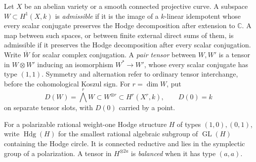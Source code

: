 \documentclass[11pt]{article}
\newcommand{\C}{\mathbb C}
\theoremstyle{plain}
\theoremstyle{definition}
\theoremstyle{remark}
\numberwithin{equation}{section}
\begin{document}
Let \(X\) be an abelian variety or a smooth connected projective curve.
A subspace \(W\subset H^1(X,k)\) is \emph{admissible} if it is the image
of a \(k\)-linear idempotent whose every scalar conjugate preserves the
Hodge decomposition after extension to \(\C\).  A map between such
spaces, or between finite external direct sums of them, is admissible
if it preserves the Hodge decomposition after every scalar conjugation.
Write \(\overline W\) for scalar complex conjugation.  A \emph{pair
tensor} between \(W,W'\) is a tensor in \(W\otimes W'\) inducing an
isomorphism \(W^*\to W'\), whose every scalar conjugate has type
\((1,1)\).  Symmetry and alternation refer to ordinary tensor
interchange, before the cohomological Koszul sign.  For \(r=\dim W\), put
\[
 D(W)=\bigwedge^rW\subset W^{\otimes r}\subset H^r(X^r,k),
 \qquad D(0)=k
\]
on separate tensor slots, with \(D(0)\) carried by a point.

For a polarizable rational weight-one Hodge structure \(H\) of types
\((1,0),(0,1)\), write \(\operatorname{Hdg}(H)\) for the smallest
rational algebraic subgroup of \(\operatorname{GL}(H)\) containing the
Hodge circle.  It is connected reductive and lies in the symplectic
group of a polarization.  A tensor in \(H^{\otimes 2a}\) is
\emph{balanced} when it has type \((a,a)\).
\end{document}
